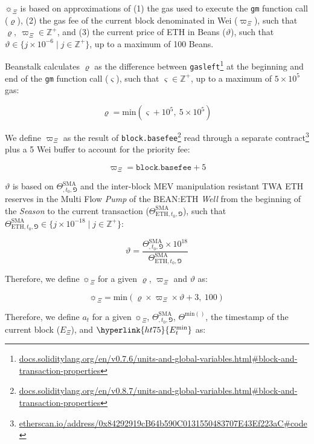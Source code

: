 \documentclass[tikz]{article}
\newcommand{\code}[1]{\texttt{#1}}
\newcommand{\term}[1]{\textsl{#1}}
\newcommand{\fref}[1]{\footnote{\href{http://#1}{#1}}}
\newcommand{\bean}{} %
\begin{document}
$\sun_{\Xi}$ is based on approximations of (1) the gas used to execute the \code{gm} function call ($\varrho$), (2) the gas fee of the current block denominated in Wei ($\varpi_\Xi$), such that $\varrho,\ \varpi_\Xi \in \mathbb{Z}^{+}$, and (3) the current price of ETH in Beans ($\vartheta$), such that $\vartheta \in \{j \times 10^{-6} \mid j \in \mathbb{Z}^{+} \}$, up to a maximum of 100 Beans.

Beanstalk calculates $\varrho$ as the difference between \code{gasleft}\fref{docs.soliditylang.org/en/v0.7.6/units-and-global-variables.html\#block-and-transaction-properties} at the beginning and end of the \code{gm} function call ($\varsigma$), such that $\varsigma \in \mathbb{Z}^{+}$, up to a maximum of $5 \times 10^5$ gas:

    $$
        \varrho = \text{min}(\varsigma + 10^5,\ 5 \times 10^5)
    $$

We define $\varpi_\Xi$ as the result of \code{block.basefee}\fref{docs.soliditylang.org/en/v0.8.7/units-and-global-variables.html\#block-and-transaction-properties} read through a separate contract\fref{etherscan.io/address/0x84292919cB64b590C0131550483707E43Ef223aC\#code} plus a 5 Wei buffer to account for the priority fee:

    $$
        \varpi_\Xi = \code{block.basefee} + 5
    $$

$\vartheta$ is based on $\Theta^{\text{SMA}}_{\bean,t_0,\Game}$ and the inter-block MEV manipulation resistant TWA ETH reserves in the Multi Flow \term{Pump} of the BEAN:ETH \term{Well} from the beginning of the \term{Season} to the current transaction ($\Theta^{\text{SMA}}_{\text{ETH},t_0,\Game}$), such that $\Theta^{\text{SMA}}_{\text{ETH},t_0,\Game} \in \{j \times 10^{-18} \mid j \in \mathbb{Z}^{+} \}$:

    $$
        \vartheta = 
        \frac{\Theta^{\text{SMA}}_{\bean,t_0,\Game} \times 10^{18}}
            {\Theta^{\text{SMA}}_{\text{ETH},t_0,\Game}}
    $$

Therefore, we define $\sun_{\Xi}$ for a given $\varrho$, $\varpi_\Xi$ and $\vartheta$ as:

\vspace*{-3mm}

    $$
        \sun_{\Xi} = \text{min}(\varrho \times \varpi_\Xi \times \vartheta + 3,\ 100)
    $$

Therefore, we define $a_t$ for a given $\sun_{\Xi}$, $\Theta^{\text{SMA}}_{\bean,t_0,\Game}$, $\Theta^{\text{min}(\bean)}$, the timestamp of the current block ($E_\Xi$), and $\hyperlink{ht75}{E_{t}^{\text{min}}}$ as:
\end{document}
